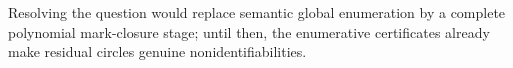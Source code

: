 Resolving the question would replace semantic global enumeration by a complete polynomial mark-closure stage; until then, the enumerative certificates already make residual circles genuine nonidentifiabilities.